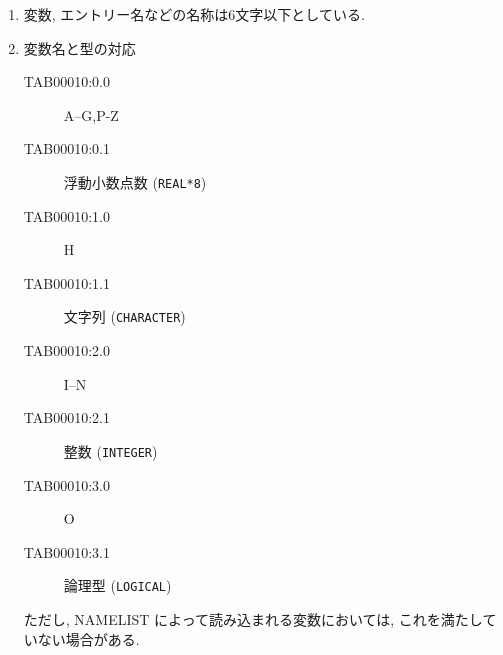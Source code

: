 \begin{enumerate}

\item 変数, エントリー名などの名称は6文字以下としている.

\item 変数名と型の対応 
\begin{center}
\begin{description}
\item[TAB00010:0.0] A--G,P-Z
\item[TAB00010:0.1] 浮動小数点数 ({\tt REAL*8})
\item[TAB00010:1.0] H
\item[TAB00010:1.1] 文字列 ({\tt CHARACTER})
\item[TAB00010:2.0] I--N
\item[TAB00010:2.1] 整数   ({\tt INTEGER})
\item[TAB00010:3.0] O
\item[TAB00010:3.1] 論理型 ({\tt LOGICAL})
\end{description}
\end{center}
ただし, NAMELIST によって読み込まれる変数においては, 
これを満たしていない場合がある.


\end{enumerate}
